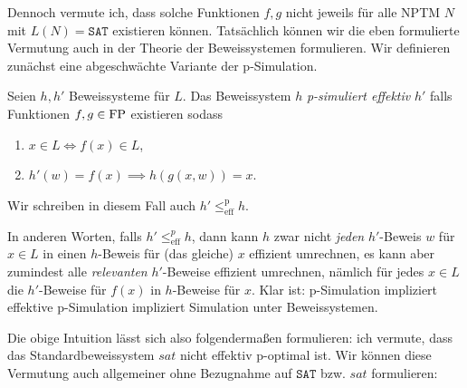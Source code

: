 Dennoch vermute ich, dass solche Funktionen $f,g$ nicht jeweils für alle NPTM $N$ mit $L(N)=\mathtt{SAT}$ existieren können.
Tatsächlich können wir die eben formulierte Vermutung auch in der Theorie der Beweissystemen formulieren.
Wir definieren zunächst eine abgeschwächte Variante der p-Simulation.
\begin{definition}
    Seien $h,h'$ Beweissysteme für $L$. Das Beweissystem $h$ \emph{p-simuliert effektiv} $h'$ falls Funktionen $f,g\in\mathrm{FP}$ existieren sodass
    \begin{enumerate}
        \item $x\in L \iff f(x)\in L$,
        \item $ h'(w)=f(x) \implies h(g(x, w)) = x. $
    \end{enumerate}
    Wir schreiben in diesem Fall auch $h'\leq^\mathrm p_\mathrm{eff} h$.
\end{definition}
In anderen Worten, falls $h'\leq^p_\mathrm{eff} h$, dann kann $h$ zwar nicht \emph{jeden} $h'$-Beweis $w$ für $x\in L$ in einen $h$-Beweis für (das gleiche) $x$ effizient umrechnen, es kann aber zumindest alle \emph{relevanten} $h'$-Beweise effizient umrechnen, nämlich für jedes $x\in L$ die $h'$-Beweise für $f(x)$ in $h$-Beweise für $x$.
Klar ist: p-Simulation impliziert effektive p-Simulation impliziert Simulation unter Beweissystemen.

Die obige Intuition lässt sich also folgendermaßen formulieren: ich vermute, dass das Standardbeweissystem $\mathit{sat}$ nicht effektiv p-optimal ist.
Wir können diese Vermutung auch allgemeiner ohne Bezugnahme auf $\mathtt{SAT}$ bzw. $\mathit{sat}$ formulieren:

